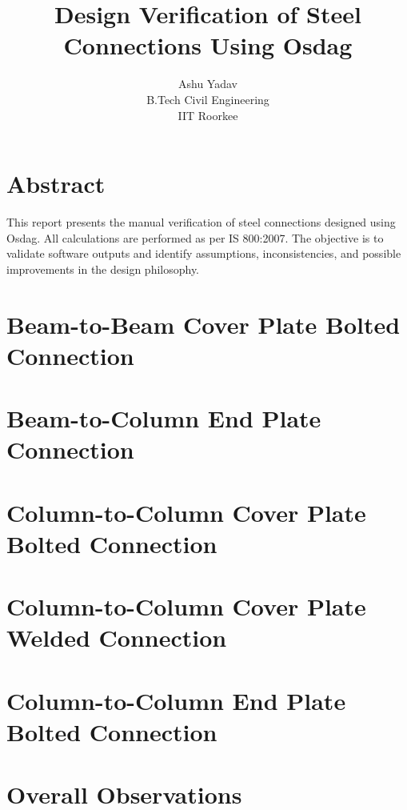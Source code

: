 \documentclass[12pt]{report}
\title{\textbf{Design Verification of Steel Connections Using Osdag}}
\author{Ashu Yadav \\ B.Tech Civil Engineering \\ IIT Roorkee}
\date{}
\begin{document}
\maketitle

\chapter*{Abstract}
This report presents the manual verification of steel connections designed using Osdag. All calculations are performed as per IS 800:2007. The objective is to validate software outputs and identify assumptions, inconsistencies, and possible improvements in the design philosophy.

\tableofcontents
\newpage

\chapter{Beam-to-Beam Cover Plate Bolted Connection}


\chapter{Beam-to-Column End Plate Connection}


\chapter{Column-to-Column Cover Plate Bolted Connection}


\chapter{Column-to-Column Cover Plate Welded Connection}


\chapter{Column-to-Column End Plate Bolted Connection}


\chapter{Overall Observations}
\end{document}
